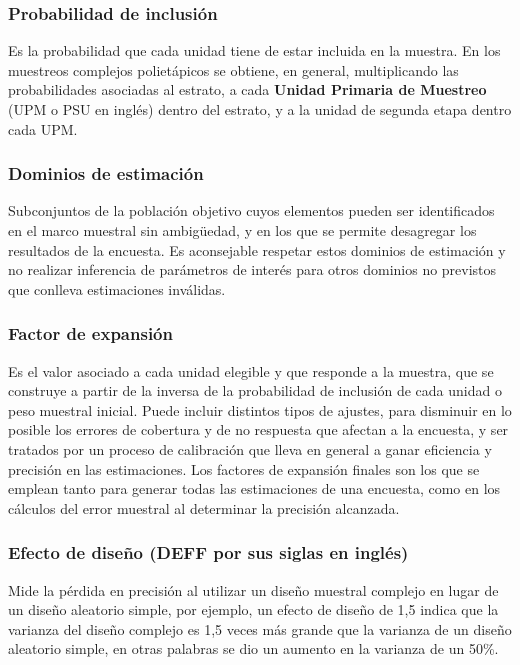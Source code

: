 \documentclass[
  spanish,
  a4paper,
]{scrbook}
\begin{document}
\subsubsection{Probabilidad de
inclusión}\label{probabilidad-de-inclusiuxf3n}

Es la probabilidad que cada unidad tiene de estar incluida en la
muestra. En los muestreos complejos polietápicos se obtiene, en general,
multiplicando las probabilidades asociadas al estrato, a cada
\textbf{Unidad Primaria de Muestreo} (UPM o PSU en inglés) dentro del
estrato, y a la unidad de segunda etapa dentro cada UPM.

\subsubsection{Dominios de estimación}\label{dominios-de-estimaciuxf3n}

Subconjuntos de la población objetivo cuyos elementos pueden ser
identificados en el marco muestral sin ambigüedad, y en los que se
permite desagregar los resultados de la encuesta. Es aconsejable
respetar estos dominios de estimación y no realizar inferencia de
parámetros de interés para otros dominios no previstos que conlleva
estimaciones inválidas.

\subsubsection{Factor de expansión}\label{factor-de-expansiuxf3n}

Es el valor asociado a cada unidad elegible y que responde a la muestra,
que se construye a partir de la inversa de la probabilidad de inclusión
de cada unidad o peso muestral inicial. Puede incluir distintos tipos de
ajustes, para disminuir en lo posible los errores de cobertura y de no
respuesta que afectan a la encuesta, y ser tratados por un proceso de
calibración que lleva en general a ganar eficiencia y precisión en las
estimaciones. Los factores de expansión finales son los que se emplean
tanto para generar todas las estimaciones de una encuesta, como en los
cálculos del error muestral al determinar la precisión alcanzada.

\subsubsection{Efecto de diseño (DEFF por sus siglas en
inglés)}\label{efecto-de-diseuxf1o-deff-por-sus-siglas-en-ingluxe9s}

Mide la pérdida en precisión al utilizar un diseño muestral complejo en
lugar de un diseño aleatorio simple, por ejemplo, un efecto de diseño de
1,5 indica que la varianza del diseño complejo es 1,5 veces más grande
que la varianza de un diseño aleatorio simple, en otras palabras se dio
un aumento en la varianza de un 50\%.
\end{document}
